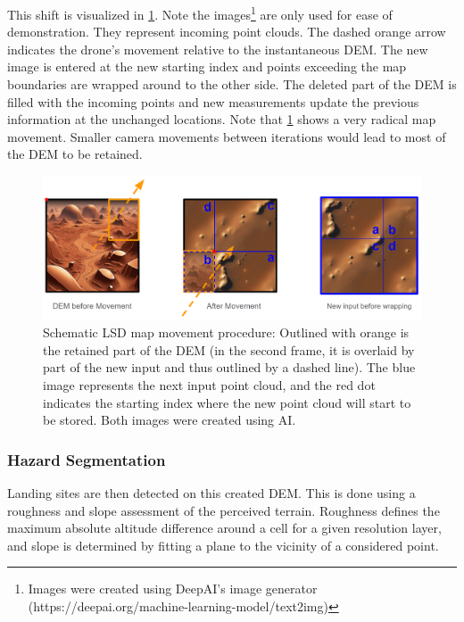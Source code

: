 \documentclass{article}
\begin{document}
This shift is visualized in \cref{fig:map_movement}. Note the images\footnote[1]{Images were created using DeepAI's image generator (https://deepai.org/machine-learning-model/text2img)} are only used for ease of demonstration. They represent incoming point clouds. The dashed orange arrow indicates the drone's movement relative to the instantaneous DEM. The new image is entered at the new starting index and points exceeding the map boundaries are wrapped around to the other side. The deleted part of the DEM is filled with the incoming points and new measurements update the previous information at the unchanged locations. Note that \cref{fig:map_movement} shows a very radical map movement. Smaller camera movements between iterations would lead to most of the DEM to be retained.

\begin{figure}[ht!]
    \centering
    \includegraphics[scale=0.25]{images/system_overview/map_movement.png}
    \caption{Schematic LSD map movement procedure: Outlined with orange is the retained part of the DEM (in the second frame, it is overlaid by part of the new input and thus outlined by a dashed line). The blue image represents the next input point cloud, and the red dot indicates the starting index where the new point cloud will start to be stored. Both images were created using AI.}
    \label{fig:map_movement}
\end{figure}


\subsubsection{Hazard Segmentation}\label{subsubsec:setup:haz_seg}

Landing sites are then detected on this created DEM. This is done using a roughness and slope assessment of the perceived terrain. Roughness defines the maximum absolute altitude difference around a cell for a given resolution layer, and slope is determined by fitting a plane to the vicinity of a considered point.
\end{document}

